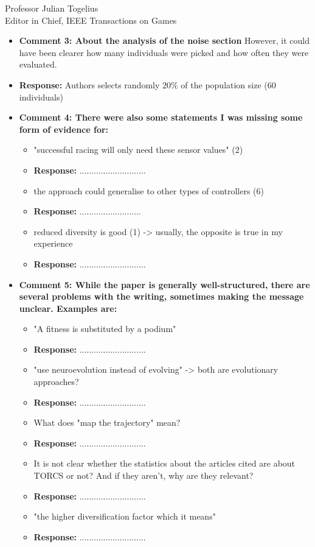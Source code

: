 \documentclass[10pt]{letter} %
\begin{document}
\begin{letter}{Professor Julian Togelius \\ Editor in Chief, IEEE Transactions on Games}
\begin{enumerate}
\begin{itemize}
		\item {\bf   Comment 3:	About the analysis of the noise section} However, it could have been clearer how many individuals were picked and how often they were evaluated.\\
		\item {\bf Response:}
		Authors selects randomly $20\%$ of the population size (60 individuals)
	
		\item {\bf   Comment 4: There were also some statements I was missing some form of evidence for:}
			\begin{itemize}
			\item	"successful racing will only need these sensor values" (2)\\
					\item {\bf Response:} ............................
			\item	the approach could generalise to other types of controllers (6)\\
					\item {\bf Response:} ..........................
			\item	reduced diversity is good (1) -> usually, the opposite is true in my experience\\
					\item {\bf Response:} ............................
			\end{itemize}

		\item {\bf 	  Comment 5: While the paper is generally well-structured, there are several problems with the writing, sometimes making the message unclear. Examples are:}
			\begin{itemize}
			\item "A fitness is substituted by a podium"\\
					\item {\bf Response:} ............................
			\item "use neuroevolution instead of evolving" -> both are evolutionary approaches?\\
					\item {\bf Response:} ............................
			\item What does "map the trajectory" mean?\\
					\item {\bf Response:} ............................
			\item It is not clear whether the statistics about the articles cited are about TORCS or not? And if they aren't, why are they relevant?\\
					\item {\bf Response:} ............................
			\item "the higher diversification factor which it means"\\
					\item {\bf Response:} ............................
			\end{itemize}
	


\end{itemize}
\end{enumerate}
\end{letter}
\end{document}
